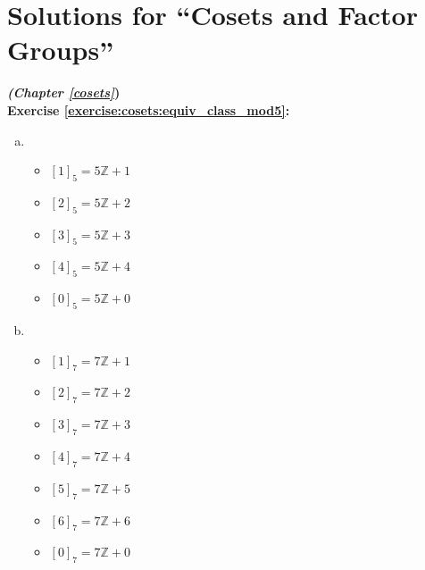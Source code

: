 
\section{Solutions for ``Cosets and Factor Groups''}
\noindent\textbf{\textit{ (Chapter \ref{cosets}})}\bigskip
\\
\textbf{Exercise \ref{exercise:cosets:equiv_class_mod5}:}
\begin{multicols}{2}
\begin{enumerate}[(a)]
\item
	\begin{itemize}
	\item
	$[1]_5 = 5{\mathbb Z} + 1$
	\item
	$[2]_5 = 5{\mathbb Z} + 2$
	\item
	$[3]_5 = 5{\mathbb Z} + 3$
	\item
	$[4]_5 = 5{\mathbb Z} + 4$
	\item
	$[0]_5 = 5{\mathbb Z} + 0$
	\end{itemize}
\columnbreak	
\item
	\begin{itemize}
	\item
	$[1]_7 = 7{\mathbb Z} + 1$
	\item
	$[2]_7 = 7{\mathbb Z} + 2$
	\item
	$[3]_7 = 7{\mathbb Z} + 3$
	\item
	$[4]_7 = 7{\mathbb Z} + 4$
	\item
	$[5]_7 = 7{\mathbb Z} + 5$
	\item
	$[6]_7 = 7{\mathbb Z} + 6$
	\item
	$[0]_7 = 7{\mathbb Z} + 0$
	\end{itemize}
\end{enumerate}
\end{multicols}

